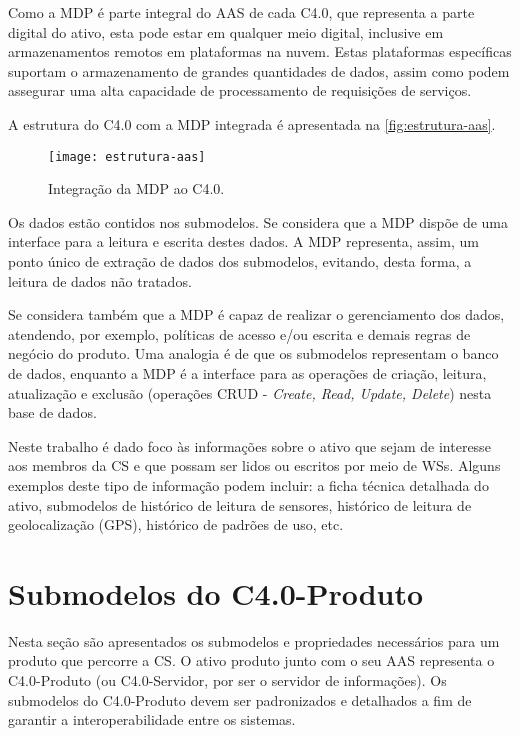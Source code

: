 Como a MDP é parte integral do AAS de cada C4.0, que representa a parte digital do ativo, esta pode estar em qualquer meio digital, inclusive em armazenamentos remotos em plataformas na nuvem. Estas plataformas específicas suportam o armazenamento de grandes quantidades de dados, assim como podem assegurar uma alta capacidade de processamento de requisições de serviços.

A estrutura do C4.0 com a MDP integrada é apresentada na \autoref{fig:estrutura-aas}.

\begin{figure}[htb]
	\centering
	\texttt{[image: estrutura-aas]}
	\caption{Integração da MDP ao C4.0.}
	\label{fig:estrutura-aas}
\end{figure}

Os dados estão contidos nos submodelos. Se considera que a MDP dispõe de uma interface para a leitura e escrita destes dados. A MDP representa, assim, um ponto único de extração de dados dos submodelos, evitando, desta forma, a leitura de dados não tratados.

Se considera também que a MDP é capaz de realizar o gerenciamento dos dados, atendendo, por exemplo, políticas de acesso e/ou escrita e demais regras de negócio do produto. Uma analogia é de que os submodelos representam o banco de dados, enquanto a MDP é a interface para as operações de criação, leitura, atualização e exclusão (operações CRUD - \textit{Create, Read, Update, Delete}) nesta base de dados.

Neste trabalho é dado foco às informações sobre o ativo que sejam de interesse aos membros da CS e que possam ser lidos ou escritos por meio de WSs. Alguns exemplos deste tipo de informação podem incluir: a ficha técnica detalhada do ativo, submodelos de histórico de leitura de sensores, histórico de leitura de geolocalização (GPS), histórico de padrões de uso, etc.

\section{Submodelos do C4.0-Produto}
\label{sec:submodelos-produto}

Nesta seção são apresentados os submodelos e propriedades necessários para um produto que percorre a CS. O ativo produto junto com o seu AAS representa o C4.0-Produto (ou C4.0-Servidor, por ser o servidor de informações). Os submodelos do C4.0-Produto devem ser padronizados e detalhados a fim de garantir a interoperabilidade entre os sistemas.

